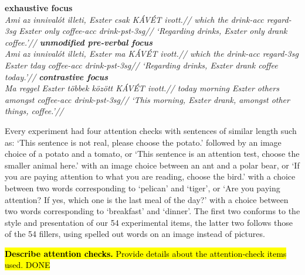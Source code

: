 \documentclass[a4paper, ruler]{CUP-JNL-LIN}%
\begin{document}
\pex[everygla={},aboveglftskip=0em,interpartskip=4pt]
\a \begingl \label{ex:stimuli_exhaustive}\textbf{exhaustive focus}\\
\gla \it Ami \it az \it innivalót \it illeti, \it Eszter \it csak \it KÁVÉT \it ivott.//
\glb which{\sc [rel]} the drink-{\sc acc} regard-3{\sc sg} Eszter only coffee-{\sc acc} drink-{\sc pst}-3{\sc sg}//
\glft \quad `Regarding drinks, Eszter only drank coffee.'//
\endgl
\a \begingl \label{ex:stimuli_pvf}\textbf{unmodified pre-verbal focus}\\
\gla \it Ami \it {az innivalót} \it illeti, \it Eszter \it ma \it KÁVÉT \it ivott.//
\glb which{\sc [rel]} {the drink-{\sc acc}} regard-3{\sc sg} Eszter tday coffee-{\sc acc} drink-{\sc pst}-3{\sc sg}//
\glft \quad `Regarding drinks, Eszter drank coffee today.'//
\endgl
\a \begingl \label{ex:stimuli_contrastive}\textbf{contrastive focus}\\
\gla \it Ma \it reggel \it Eszter \it többek \it között \it KÁVÉT \it ivott.//
\glb today morning Eszter others amongst coffee-{\sc acc} drink-{\sc pst}-3{\sc sg}//
\glft \quad `This morning, Eszter drank, amongst other things, coffee.'//
\endgl
\xe

Every experiment had four attention checks with sentences of similar length such as: `This sentence is not real, please choose the potato.' followed by an image choice of a potato and a tomato, or `This sentence is an attention test, choose the smaller animal here.' with an image choice between an ant and a polar bear, or `If you are paying attention to what you are reading, choose the bird.' with a choice between two words corresponding to `pelican' and `tiger', or `Are you paying attention? If yes, which one is the last meal of the day?' with a choice between two words corresponding to `breakfast' and `dinner'. The first two conforms to the style and presentation of our 54 experimental items, the latter two follows those of the 54 fillers, using spelled out words on an image instead of pictures.

\hl{\textbf{Describe attention checks.} Provide details about the attention‑check items used. DONE}
\end{document}
